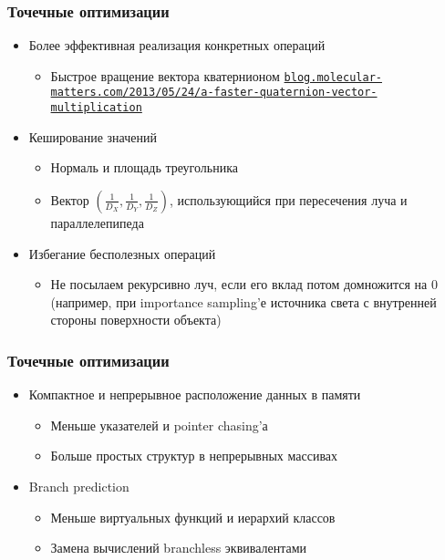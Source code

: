 \documentclass[10pt]{beamer}
\begin{document}
\begin{frame}[fragile]
\frametitle{Точечные оптимизации}
\begin{itemize}
\item Более эффективная реализация конкретных операций
\pause
\begin{itemize}
\item Быстрое вращение вектора кватернионом \href{https://blog.molecular-matters.com/2013/05/24/a-faster-quaternion-vector-multiplication/}{\texttt{blog.molecular-matters.com/2013/05/24/a-faster-quaternion-vector-multiplication}}
\end{itemize}
\pause
\item Кеширование значений
\pause
\begin{itemize}
\item Нормаль и площадь треугольника
\pause
\item Вектор \begin{math}\left(\frac{1}{D_X}, \frac{1}{D_Y}, \frac{1}{D_Z}\right)\end{math}, использующийся при пересечения луча и параллелепипеда
\end{itemize}
\pause
\item Избегание бесполезных операций
\pause
\begin{itemize}
\item Не посылаем рекурсивно луч, если его вклад потом домножится на 0 (например, при importance sampling'е источника света с внутренней стороны поверхности объекта)
\end{itemize}
\end{itemize}
\end{frame}

\begin{frame}[fragile]
\frametitle{Точечные оптимизации}
\begin{itemize}
\item Компактное и непрерывное расположение данных в памяти
\pause
\begin{itemize}
\item Меньше указателей и pointer chasing'а
\pause
\item Больше простых структур в непрерывных массивах
\end{itemize}
\pause
\item Branch prediction
\pause
\begin{itemize}
\item Меньше виртуальных функций и иерархий классов
\pause
\item Замена вычислений branchless эквивалентами
\end{itemize}
\end{itemize}
\end{frame}
\end{document}
